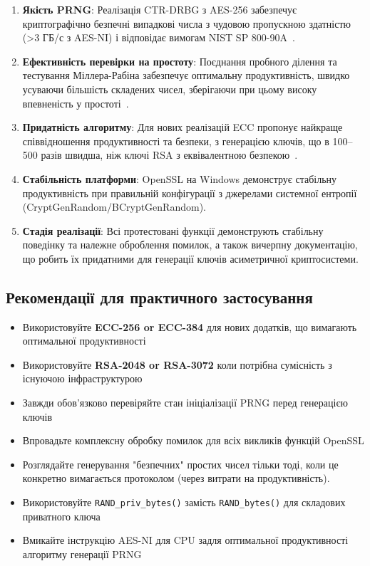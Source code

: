 \begin{enumerate}
    \item \textbf{Якість PRNG}: Реалізація CTR-DRBG з AES-256 забезпечує криптографічно безпечні випадкові числа 
        з чудовою пропускною здатністю (>3 ГБ/с з AES-NI) і відповідає вимогам NIST SP 800-90A~\cite{barker2015recommendation}.
    \item \textbf{Ефективність перевірки на простоту}: Поєднання пробного ділення та тестування Міллера-Рабіна забезпечує
        оптимальну продуктивність, швидко усуваючи більшість складених чисел, зберігаючи при цьому високу впевненість у 
        простоті~\cite{crandall2005prime}.
    \item \textbf{Придатність алгоритму}: Для нових реалізацій ECC пропонує найкраще співвідношення продуктивності та безпеки, 
        з генерацією ключів, що в 100--500 разів швидша, ніж ключі RSA з еквівалентною безпекою~\cite{hankerson2006guide}.
    \item \textbf{Стабільність платформи}: OpenSSL на Windows демонструє стабільну продуктивність при правильній конфігурації з
        джерелами системної ентропії (CryptGenRandom/BCryptGenRandom).
    \item \textbf{Стадія реалізації}: Всі протестовані функції демонструють стабільну поведінку та належне оброблення помилок, а також 
        вичерпну документацію, що робить їх придатними для генерації ключів асиметричної криптосистеми.
\end{enumerate}

\subsection{Рекомендації для практичного застосування}

\begin{itemize}
    \item Використовуйте \textbf{ECC-256 or ECC-384} для нових додатків, що вимагають оптимальної продуктивності
    \item Використовуйте \textbf{RSA-2048 or RSA-3072} коли потрібна сумісність з існуючою інфраструктурою
    \item Завжди обов'язково перевіряйте стан ініціалізації PRNG перед генерацією ключів
    \item Впровадьте комплексну обробку помилок для всіх викликів функцій OpenSSL
    \item Розглядайте генерування "безпечних"{} простих чисел тільки тоді, коли це конкретно вимагається протоколом 
        (через витрати на продуктивність).
    \item Використовуйте \texttt{RAND\_priv\_bytes()} замість \texttt{RAND\_bytes()} для складових приватного ключа
    \item Вмикайте інструкцію AES-NI для CPU задля оптимальної продуктивності алгоритму генерації PRNG
\end{itemize}

